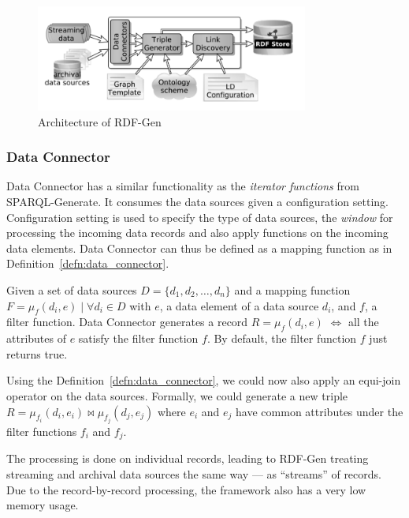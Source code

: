 \begin{figure}[!htbp]
  \centering
  \includegraphics[width=0.8\textwidth]{fig/rdf-gen-arch.png}
  \caption{Architecture of RDF-Gen\cite{rdf_gen}}
  \label{fig:rdf-gen-arch}
\end{figure}

\subsubsection{Data Connector}
Data Connector has a similar functionality as the \emph{iterator functions} from SPARQL-Generate.
It consumes the data sources given a configuration setting. Configuration setting is used to specify 
the type of data sources, the \emph{window} for processing the incoming data records and 
also apply functions on the incoming data elements. Data Connector can thus be defined as a 
mapping function as in Definition~\ref{defn:data_connector}. 


\begin{defn}
  \label{defn:data_connector}
  Given a set of data sources $D = \{d_1, d_2, \dots, d_n\}$ and  a 
  mapping function $F = \mu_{f}(d_i, e)\; |\; \forall d_i \in D$ with $e$, a data element 
  of a data source $d_i$, and $f$, a filter function. Data Connector 
  generates a record $R = \mu_{f}(d_i, e)$ $\iff$ all the attributes of 
  $e$ satisfy the filter function $f$. By default, the filter function $f$ just returns true. 
\end{defn}

Using the Definition~\ref{defn:data_connector}, we could now also apply an equi-join operator 
on the data sources. Formally, we could generate a new triple 
$R =  \mu_{f_i}(d_i, e_i) \bowtie  \mu_{f_j}(d_j, e_j) $ where $e_i$ and $e_j$ have 
common attributes under the filter functions $f_i$ and $f_j$. 

The processing is done on individual records, leading to 
RDF-Gen treating streaming and archival data sources the same way --- as “streams” 
of records. Due to the record-by-record processing, the framework also has a very low 
memory usage. 

